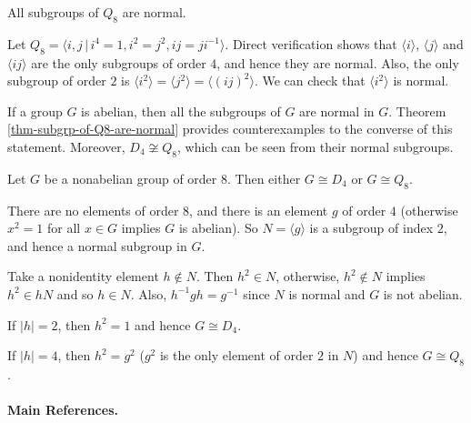 \begin{theorem} \label{thm-subgrp-of-Q8-are-normal}
	All subgroups of $Q_8$ are normal.
\end{theorem}
\begin{sketch}
	Let $Q_8 = \langle i,j\,|\, i^4=1, i^2=j^2, ij = ji^{-1}  \rangle$. Direct verification shows that $\langle i\rangle$, $\langle j\rangle$ and $\langle ij\rangle$ are the only subgroups of order $4$, and hence they are normal. Also, the only subgroup of order $2$ is $\langle i^2 \rangle = \langle j^2 \rangle = \langle (ij)^2 \rangle$. We can check that $\langle i^2\rangle$ is normal. 
\end{sketch}
If a group $G$ is abelian, then all the subgroups of $G$ are normal in $G$. Theorem \ref{thm-subgrp-of-Q8-are-normal} provides counterexamples to the converse of this statement. Moreover, $D_4\not\cong Q_8$, which can be seen from their normal subgroups.

\begin{theorem} \label{thm-nonabelian-order-8}
	Let $G$ be a nonabelian group of order $8$. Then either $G \cong D_4$ or $G\cong Q_8$.
\end{theorem}
\begin{sketch}
	There are no elements of order $8$, and there is an element $g$ of order $4$ (otherwise $x^2=1$ for all $x\in G$ implies $G$ is abelian). So $N=\langle g\rangle$ is a subgroup of index $2$, and hence a normal subgroup in $G$. 
	
	Take a nonidentity element $h\not\in N$. Then $h^2\in N$, otherwise,  $h^2 \not\in N$ implies $h^2\in hN$ and so $h\in N$. Also, $h^{-1}gh = g^{-1}$ since $N$ is normal and $G$ is not abelian.
	
	If $|h| = 2$, then $h^2= 1$ and hence $G\cong D_4$.
	
	If $|h| = 4$, then $h^2 = g^2$ ($g^2$ is the only element of order $2$ in $N$) and hence $G\cong Q_8$.
\end{sketch}

\paragraph{Main References.} \cite{DummitFoote2004,Artin1991,Hungerford1974}

